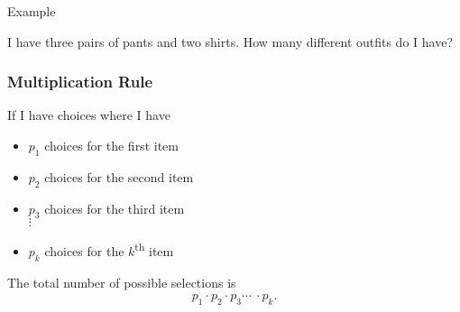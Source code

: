 \begin{frame}{Example}

  I have three pairs of pants and two shirts. How many different
  outfits do I have?

  \vfill


  \vfill
  
\end{frame}

\begin{frame}
  \frametitle{Multiplication Rule}

  \begin{definition}
    If I have choices where I have
    \begin{itemize}
    \item $p_1$ choices for the first item
    \item $p_2$ choices for the second item
    \item $p_3$ choices for the third item \\
      $\vdots$
    \item $p_k$ choices for the $k$\textsuperscript{th} item \\
    \end{itemize}

    The total number of possible selections is 
    \begin{eqnarray*}
      p_1 \cdot p_2 \cdot p_3 \cdots ~ \cdot p_k.
    \end{eqnarray*}

  \end{definition}

\end{frame}

